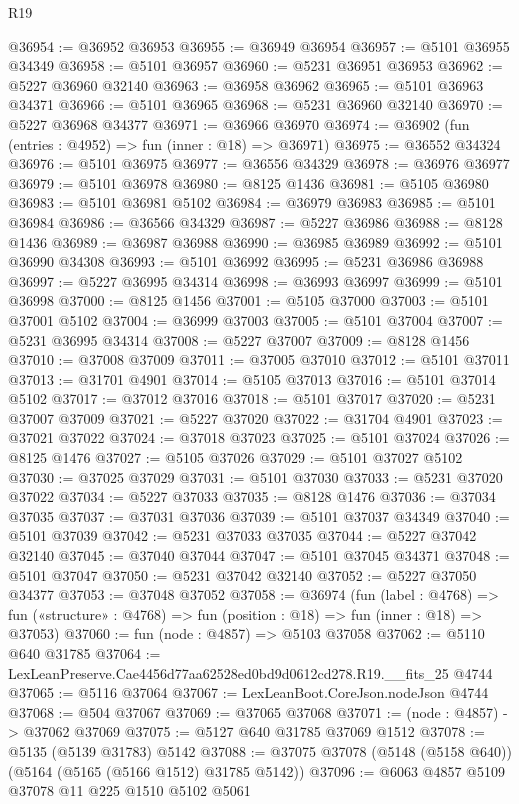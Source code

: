 \begin{lexlean}{R19}
\begin{coremodule}
{{{{{{{{{{{@36954 := @36952 @36953
@36955 := @36949 @36954
@36957 := @5101 @36955 @34349
@36958 := @5101 @36957
@36960 := @5231 @36951 @36953
@36962 := @5227 @36960 @32140
@36963 := @36958 @36962
@36965 := @5101 @36963 @34371
@36966 := @5101 @36965
@36968 := @5231 @36960 @32140
@36970 := @5227 @36968 @34377
@36971 := @36966 @36970
@36974 := @36902 (fun (entries : @4952) => fun (inner : @18) => @36971)
@36975 := @36552 @34324
@36976 := @5101 @36975
@36977 := @36556 @34329
@36978 := @36976 @36977
@36979 := @5101 @36978
@36980 := @8125 @1436
@36981 := @5105 @36980
@36983 := @5101 @36981 @5102
@36984 := @36979 @36983
@36985 := @5101 @36984
@36986 := @36566 @34329
@36987 := @5227 @36986
@36988 := @8128 @1436
@36989 := @36987 @36988
@36990 := @36985 @36989
@36992 := @5101 @36990 @34308
@36993 := @5101 @36992
@36995 := @5231 @36986 @36988
@36997 := @5227 @36995 @34314
@36998 := @36993 @36997
@36999 := @5101 @36998
@37000 := @8125 @1456
@37001 := @5105 @37000
@37003 := @5101 @37001 @5102
@37004 := @36999 @37003
@37005 := @5101 @37004
@37007 := @5231 @36995 @34314
@37008 := @5227 @37007
@37009 := @8128 @1456
@37010 := @37008 @37009
@37011 := @37005 @37010
@37012 := @5101 @37011
@37013 := @31701 @4901
@37014 := @5105 @37013
@37016 := @5101 @37014 @5102
@37017 := @37012 @37016
@37018 := @5101 @37017
@37020 := @5231 @37007 @37009
@37021 := @5227 @37020
@37022 := @31704 @4901
@37023 := @37021 @37022
@37024 := @37018 @37023
@37025 := @5101 @37024
@37026 := @8125 @1476
@37027 := @5105 @37026
@37029 := @5101 @37027 @5102
@37030 := @37025 @37029
@37031 := @5101 @37030
@37033 := @5231 @37020 @37022
@37034 := @5227 @37033
@37035 := @8128 @1476
@37036 := @37034 @37035
@37037 := @37031 @37036
@37039 := @5101 @37037 @34349
@37040 := @5101 @37039
@37042 := @5231 @37033 @37035
@37044 := @5227 @37042 @32140
@37045 := @37040 @37044
@37047 := @5101 @37045 @34371
@37048 := @5101 @37047
@37050 := @5231 @37042 @32140
@37052 := @5227 @37050 @34377
@37053 := @37048 @37052
@37058 := @36974
    (fun (label : @4768) =>
    fun («structure» : @4768) => fun (position : @18) => fun (inner : @18) => @37053)
@37060 := fun (node : @4857) => @5103 @37058
@37062 := @5110 @640 @31785
@37064 := LexLeanPreserve.Cae4456d77aa62528ed0bd9d0612cd278.R19.__fits_25 @4744
@37065 := @5116 @37064
@37067 := LexLeanBoot.CoreJson.nodeJson @4744
@37068 := @504 @37067
@37069 := @37065 @37068
@37071 := (node : @4857) -> @37062 @37069
@37075 := @5127 @640 @31785 @37069 @1512
@37078 := @5135 (@5139 @31783) @5142
@37088 := @37075 @37078 (@5148 (@5158 @640)) (@5164 (@5165 (@5166 @1512) @31785 @5142))
@37096 := @6063 @4857 @5109 @37078 @11 @225 @1510 @5102 @5061
}}}}}}}}}}}
\end{coremodule}
\end{lexlean}

